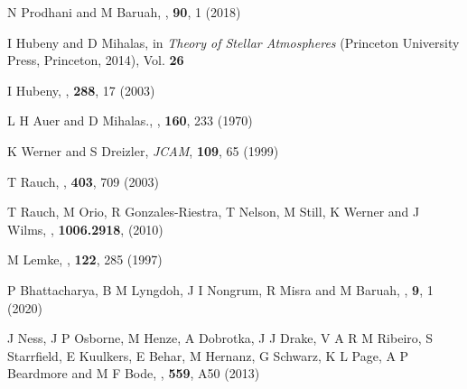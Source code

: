 \begin{thebibliography}{100}
	N Prodhani and M Baruah, \textit{\Pram}, \textbf{90}, 1 (2018)
	

	I  Hubeny and D Mihalas, in \textit{Theory of Stellar Atmospheres} (Princeton University Press, Princeton, 2014), Vol. \textbf{26}
	
	I Hubeny, \textit{\SAM}, \textbf{288}, 17 (2003)
	
	L H Auer and D Mihalas., \textit{\ApJ}, \textbf{160}, 233 (1970)
	
	K Werner and S Dreizler, \textit{JCAM}, \textbf{109}, 65 (1999)
	
	T Rauch, \textit{\AnA}, \textbf{403}, 709 (2003)
	
	T Rauch, M Orio, R Gonzales-Riestra, T Nelson, M Still, K Werner and J Wilms, \textit{\ARX}, \textbf{1006.2918}, (2010)
	
	M Lemke, \textit{\AnASS}, \textbf{122}, 285 (1997)
	
	P Bhattacharya, B M Lyngdoh, J I Nongrum, R Misra and M Baruah, \textit{\AJET}, \textbf{9}, 1 (2020)
	
	J Ness, J P Osborne, M Henze, A Dobrotka, J J Drake, V A R M Ribeiro, S Starrfield, E Kuulkers, E Behar, M Hernanz, G Schwarz, K L Page, A P Beardmore and M F Bode, \textit{\AnA}, \textbf{559}, A50 (2013)
\end{thebibliography}




